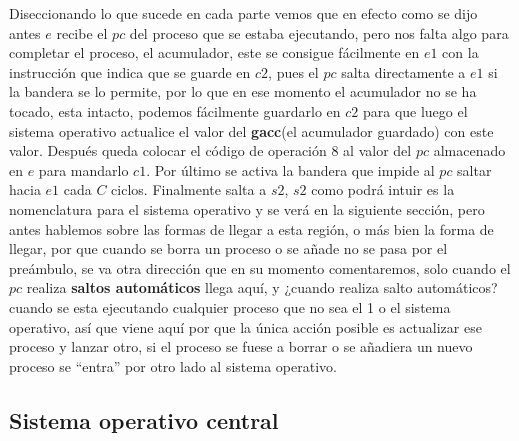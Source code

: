 \documentclass[12pt]{article}
\begin{document}
	Diseccionando lo que sucede
	en cada parte vemos que en efecto como se dijo antes $e$ recibe el $pc$ del proceso que se estaba ejecutando, pero
	nos falta algo para completar el proceso, el acumulador, este se consigue fácilmente en $e1$ con la instrucción que
	indica que se guarde en $c2$, pues el $pc$ salta directamente a $e1$ si la bandera se lo permite, por lo que en ese
	momento el acumulador no se ha tocado, esta intacto, podemos fácilmente guardarlo en $c2$ para que luego el sistema
	operativo actualice el valor del \textbf{gacc}(el acumulador guardado) con este valor. Después queda colocar el código
	de operación $8$ al valor del $pc$ almacenado en $e$ para mandarlo $c1$. Por último se activa la bandera que impide al 
	$pc$ saltar hacia $e1$ cada $C$ ciclos. Finalmente salta a $s2$, $s2$ como podrá intuir es la nomenclatura para el sistema
	operativo y se verá en la siguiente sección, pero antes hablemos sobre las formas de llegar a esta región, o más 
	bien la forma de llegar, por que cuando se borra un proceso o se añade no se pasa por el preámbulo, se va otra
	dirección que en su momento comentaremos, solo cuando el $pc$ realiza \textbf{saltos automáticos} llega aquí, y 
	¿cuando realiza salto automáticos? cuando se esta ejecutando cualquier proceso que no sea el 1 o el sistema operativo,
	así que viene aquí por que la única acción posible es actualizar ese proceso y lanzar otro, si el proceso se fuese a borrar
	o se añadiera un nuevo proceso se ``entra'' por otro lado al sistema operativo.
	
	\subsection{Sistema operativo central}
	
\end{document}
